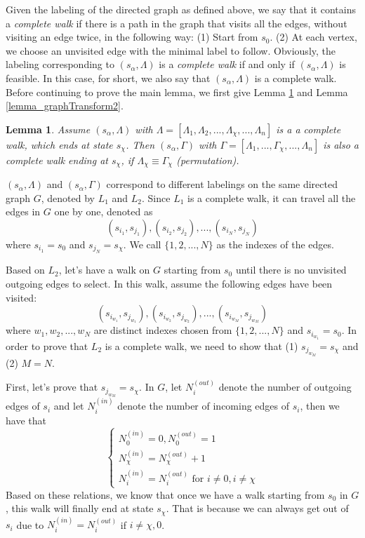 \documentclass[journal]{IEEEtran}
\newtheorem{Lemma}[Theorem]{Lemma}
\def\pmu{\equiv}
\begin{document}
Given the labeling of the directed graph as defined above, we say that it contains a \emph{complete walk} if there is a path in the graph that visits all the edges, without visiting an edge twice, in the following way: (1) Start from $s_0$. (2) At each vertex, we choose an unvisited edge with the minimal label to follow. Obviously, the labeling corresponding to $(s_\alpha, \Lambda)$ is a \emph{complete walk} if and only if $(s_\alpha, \Lambda)$ is feasible. In this case, for short, we also say that $(s_\alpha, \Lambda)$ is a complete walk.
Before continuing to prove the main lemma, we first give Lemma \ref{lemma_graphTransform} and Lemma \ref{lemma_graphTransform2}.

\begin{Lemma} Assume $(s_\alpha,\Lambda)$ with $\Lambda=[\Lambda_1,\Lambda_2,...,\Lambda_\chi,...,\Lambda_n]$ is a a complete walk, which ends at state $s_\chi$. Then $(s_\alpha,\Gamma)$ with $\Gamma=[\Lambda_1,...,\Gamma_\chi,...,\Lambda_n]$ is also a complete walk ending at $s_\chi$, if
$\Lambda_\chi \pmu \Gamma_\chi$ (permutation). \label{lemma_graphTransform}
\end{Lemma}
\proof $(s_\alpha,\Lambda)$ and $(s_\alpha,\Gamma)$ correspond to different labelings on the same directed graph $G$, denoted by $L_1$ and $L_2$. Since $L_1$ is a complete walk, it can
travel all the edges in $G$ one by one, denoted as
$$(s_{i_1},s_{j_1}),(s_{i_2},s_{j_2}),...,(s_{i_N},s_{j_N})$$
where $s_{i_1}=s_0$ and $s_{j_N}=s_\chi$. We call $\{1,2,...,N\}$ as the indexes of the edges.

Based on $L_2$, let's have a walk on $G$ starting from $s_0$ until there is no unvisited outgoing edges to select.
In this walk, assume the following edges have been visited:
$$(s_{i_{w_1}},s_{j_{w_1}}),(s_{i_{w_2}},s_{j_{w_2}}),...,(s_{i_{w_M}},s_{j_{w_M}})$$
where $w_1,w_2,...,w_N$ are distinct indexes chosen from $\{1,2,...,N\}$ and $s_{i_{w_1}}=s_0$.
In order to prove that $L_2$ is a complete walk, we need to show that
(1) $s_{j_{w_M}}=s_\chi$ and (2) $M=N$.

First, let's prove that $s_{j_{w_M}}=s_\chi$. In $G$, let $N_i^{(out)}$ denote the number of outgoing edges of $s_i$ and let
$N_{i}^{(in)}$ denote the number of incoming edges of $s_i$, then we have that
$$\left\{\begin{array}{c}
           N_{0}^{(in)}=0, N_{0}^{(out)}=1 \\
           N_{\chi}^{(in)}=N_{\chi}^{(out)}+1 \\
           N_{i}^{(in)}=N_{i}^{(out)} \textrm{ for } i\neq 0, i\neq \chi
         \end{array}
\right. $$
Based on these relations, we know that once we have a walk starting from $s_0$ in $G$, this walk will finally end at state $s_\chi$.
That is because we can always get out of $s_i$ due to $N_{i}^{(in)}=N_{i}^{(out)}$ if $i\neq \chi,0$.
\end{document}
